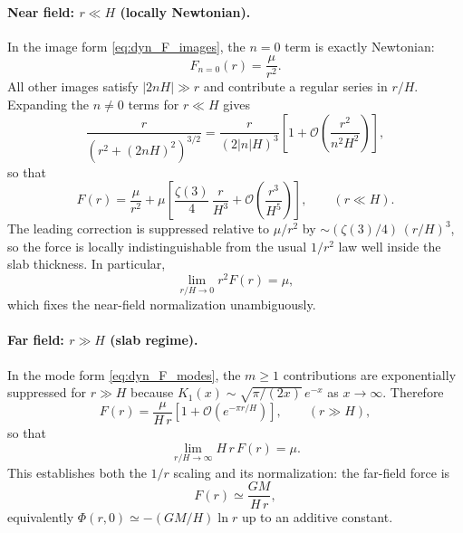 \documentclass[11pt]{article}
\begin{document}
\paragraph{Near field: $r\ll H$ (locally Newtonian).}
In the image form \eqref{eq:dyn_F_images}, the $n=0$ term is exactly Newtonian:
\begin{equation}
  F_{n=0}(r)=\frac{\mu}{r^2}.
\end{equation}
All other images satisfy $|2nH|\gg r$ and contribute a regular series in $r/H$.  Expanding the
$n\neq 0$ terms for $r\ll H$ gives
\begin{equation}
  \frac{r}{\left(r^2+(2nH)^2\right)^{3/2}}
  = \frac{r}{(2|n|H)^3}\left[1+\mathcal{O}\!\left(\frac{r^2}{n^2H^2}\right)\right],
\end{equation}
so that
\begin{equation}
  F(r)
  = \frac{\mu}{r^2}
    + \mu\left[\frac{\zeta(3)}{4}\,\frac{r}{H^3}
    + \mathcal{O}\!\left(\frac{r^3}{H^5}\right)\right],
  \qquad (r\ll H).
  \label{eq:dyn_nearfield_expansion}
\end{equation}
The leading correction is suppressed relative to $\mu/r^2$ by
$\sim (\zeta(3)/4)\,(r/H)^3$, so the force is locally indistinguishable from the usual $1/r^2$ law
well inside the slab thickness.  In particular,
\begin{equation}
  \lim_{r/H\to 0} r^2 F(r) = \mu,
\end{equation}
which fixes the near-field normalization unambiguously.

\paragraph{Far field: $r\gg H$ (slab regime).}
In the mode form \eqref{eq:dyn_F_modes}, the $m\ge 1$ contributions are exponentially suppressed for
$r\gg H$ because $K_1(x)\sim \sqrt{\pi/(2x)}\,e^{-x}$ as $x\to\infty$.  Therefore
\begin{equation}
  F(r)
  = \frac{\mu}{H\,r}\left[1+\mathcal{O}\!\left(e^{-\pi r/H}\right)\right],
  \qquad (r\gg H),
  \label{eq:dyn_farfield}
\end{equation}
so that
\begin{equation}
  \lim_{r/H\to\infty} H\,r\,F(r) = \mu.
\end{equation}
This establishes both the $1/r$ scaling and its normalization: the far-field force is
\begin{equation}
  F(r)\simeq \frac{GM}{H\,r},
\end{equation}
equivalently $\Phi(r,0)\simeq -(GM/H)\ln r$ up to an additive constant.
\end{document}
